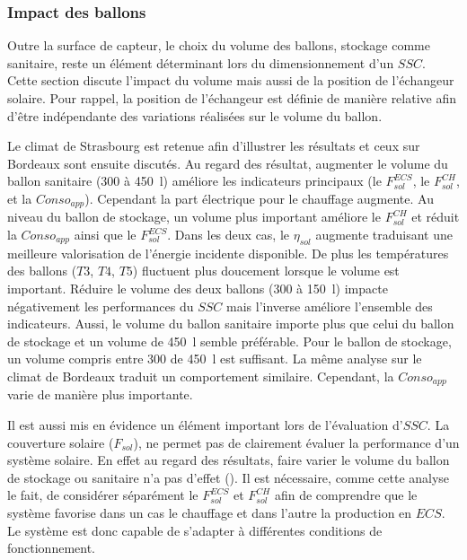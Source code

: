 \subsubsection{Impact des ballons} %
\label{ssub:impact_des_ballons}
Outre la surface de capteur, le choix du volume des ballons, stockage comme sanitaire,
reste un élément déterminant lors du dimensionnement d’un $SSC$. Cette section discute
l’impact du volume mais aussi de la position de l’échangeur solaire. Pour rappel, la
position de l’échangeur est définie de manière relative afin d’être indépendante des
variations réalisées sur le volume du ballon.

Le climat de Strasbourg est retenue afin d’illustrer les résultats et ceux sur Bordeaux
sont ensuite discutés. Au regard des résultat, augmenter le volume du ballon sanitaire
(\num{300} à \SI{450}{\litre}) améliore les indicateurs principaux (le $F_{sol}^{ECS}$, le
$F_{sol}^{CH}$, et la $Conso_{app}$). Cependant la part électrique pour le chauffage
augmente. Au niveau du ballon de stockage, un volume plus important améliore le $F_{sol}^{CH}$
et réduit la $Conso_{app}$ ainsi que le $F_{sol}^{ECS}$. Dans les deux cas, le $\eta_{sol}$
augmente traduisant une meilleure valorisation de l’énergie incidente disponible.
De plus les températures des ballons ($T3$, $T4$, $T5$) fluctuent plus doucement lorsque le
volume est important. Réduire le volume des deux ballons (\num{300} à \SI{150}{\litre})
impacte négativement les performances du $SSC$ mais l’inverse améliore l’ensemble des
indicateurs. Aussi, le volume du ballon sanitaire importe plus que celui du ballon de
stockage et un volume de \SI{450}{\litre} semble préférable. Pour le ballon de stockage,
un volume compris entre \num{300} de \SI{450}{\litre} est suffisant. La même analyse sur
le climat de Bordeaux traduit un comportement similaire. Cependant, la $Conso_{app}$
varie de manière plus importante.

Il est aussi mis en évidence un élément important lors de l’évaluation d’$SSC$. La
couverture solaire ($F_{sol}$), ne permet pas de clairement évaluer la performance d’un
système solaire. En effet au regard des résultats, faire varier le volume du ballon de
stockage ou sanitaire n’a pas d’effet (). Il est
nécessaire, comme cette analyse le fait, de considérer séparément le $F_{sol}^{ECS}$ et
$F_{sol}^{CH}$ afin de comprendre que le système favorise dans un cas le chauffage et dans
l’autre la production en $ECS$. Le système est donc capable de s’adapter à
différentes conditions de fonctionnement.

